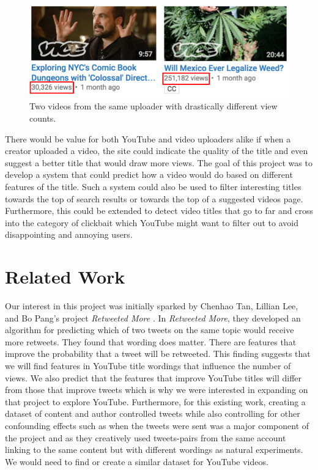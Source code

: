 \documentclass[a4paper,12pt]{article}
\begin{document}
\begin{figure}[h]
    \centering
    \includegraphics[width=.7\textwidth]{motivation}
    \caption{Two videos from the same uploader with drastically different view counts.}
    \label{fig:motivation}
\end{figure}

There would be value for both YouTube and video uploaders alike if when a creator uploaded a video, the site could indicate the quality of the title and even suggest a better title that would draw more views. The goal of this project was to develop a system that could predict how a video would do based on different features of the title. Such a system could also be used to filter interesting titles towards the top of search results or towards the top of a suggested videos page. Furthermore, this could be extended to detect video titles that go to far and cross into the category of clickbait which YouTube might want to filter out to avoid disappointing and annoying users.

\section{Related Work}
Our interest in this project was initially sparked by Chenhao Tan, Lillian Lee, and Bo Pang's project \textit{Retweeted More} \cite{tan+lee+pang:14}. In \textit{Retweeted More}, they developed an algorithm for predicting which of two tweets on the same topic would receive more retweets. They found that wording does matter. There are features that improve the probability that a tweet will be retweeted. This finding suggests that we will find features in YouTube title wordings that influence the number of views. We also predict that the features that improve YouTube titles will differ from those that improve tweets which is why we were interested in expanding on that project to explore YouTube. Furthermore, for this existing work, creating a dataset of content and author controlled tweets while also controlling for other confounding effects such as when the tweets were sent was a major component of the project and as they creatively used tweets-pairs from the same account linking to the same content but with different wordings as natural experiments. We would need to find or create a similar dataset for YouTube videos. \\
\end{document}
